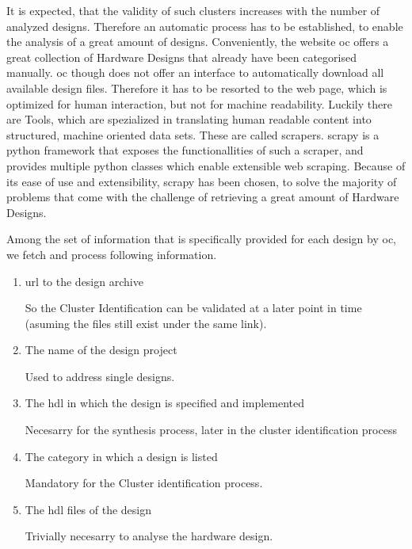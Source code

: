 It is expected, that the validity of such clusters increases with the number of analyzed designs. Therefore an automatic process has to be established, to enable the analysis of a great amount of designs. Conveniently, the website \gls{oc} offers a great collection of Hardware Designs that already have been categorised manually. \gls{oc} though does not offer an interface to automatically download all available design files. Therefore it has to be resorted to the web page, which is optimized for human interaction, but not for machine readability. Luckily there are Tools, which are spezialized in translating human readable content into structured, machine oriented data sets. These are called \glspl{scraper}. \gls{scrapy} \autocite{scrapy} is a python framework that exposes the functionallities of such a \gls{scraper}, and provides multiple python classes which enable extensible web scraping. Because of its ease of use and extensibility, \gls{scrapy} has been chosen, to solve the majority of problems that come with the challenge of retrieving a great amount of Hardware Designs.

Among the set of information that is specifically provided for each design by \gls{oc}, we fetch and process following information.  

\begin{enumerate}

	\item{\gls{url} to the design archive}
       
       So the Cluster Identification can be validated at a later point in time (asuming the files still exist under the same link).

	\item{The name of the design project}
       
       Used to address single designs. 

	\item{The \gls{hdl} in which the design is specified and implemented}
       
       Necesarry for the synthesis process, later in the cluster identification process

	\item{The category in which a design is listed}
       
       Mandatory for the Cluster identification process. 
        
	\item{The \gls{hdl} files of the design}
       
       Trivially necesarry to analyse the hardware design.
        
\end{enumerate}

